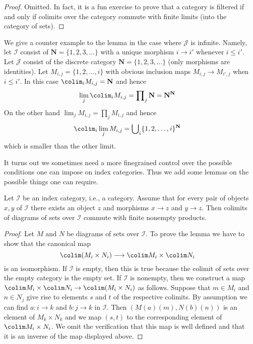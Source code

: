 \begin{proof}
Omitted. In fact, it is a fun exercise to prove that a category is
filtered if and only if colimits over the category commute with finite
limits (into the category of sets).
\end{proof}

\noindent
We give a counter example to the lemma in
the case where $\mathcal{J}$ is infinite. Namely, let
$\mathcal{I}$ consist of $\mathbf{N} = \{1, 2, 3, \ldots\}$
with a unique morphism $i \to i'$ whenever $i \leq i'$.
Let $\mathcal{J}$ consist of the discrete category
$\mathbf{N} = \{1, 2, 3, \ldots\}$ (only morphisms are identities).
Let $M_{i, j} = \{1, 2, \ldots, i\}$ with obvious inclusion maps
$M_{i, j} \to M_{i', j}$ when $i \leq i'$. In this case
$\colim_i M_{i, j} = \mathbf{N}$ and hence
$$
\lim_j \colim_i M_{i, j}
=
\prod\nolimits_j \mathbf{N}
=
\mathbf{N}^\mathbf{N}
$$
On the other hand $\lim_j M_{i, j} = \prod\nolimits_j M_{i, j}$ and
hence
$$
\colim_i \lim_j M_{i, j}
=
\bigcup\nolimits_i \{1, 2, \ldots, i\}^{\mathbf{N}}
$$
which is smaller than the other limit.

\medskip\noindent
It turns out we sometimes need a more finegrained control over the
possible conditions one can impose on index categories. Thus we add
some lemmas on the possible things one can require.

\begin{lemma}
\label{lemma-preserve-products}
Let $\mathcal{I}$ be an index category, i.e., a category. Assume
that for every pair of objects $x, y$ of $\mathcal{I}$
there exists an object $z$ and morphisms $x \to z$ and $y \to z$.
Then colimits of diagrams of sets over $\mathcal{I}$
commute with finite nonempty products.
\end{lemma}

\begin{proof}
Let $M$ and $N$ be diagrams of sets over $\mathcal{I}$.
To prove the lemma we have to show that the canonical map
$$
\colim (M_i \times N_i) \longrightarrow \colim M_i \times \colim N_i
$$
is an isomorphism.
If $\mathcal{I}$ is empty, then this is true because the colimit
of sets over the empty category is the empty set.
If $\mathcal{I}$ is nonempty, then we construct a map
$\colim M_i \times \colim N_i \to \colim (M_i \times N_i)$ as follows.
Suppose that $m \in M_i$ and $n \in N_j$ give rise to elements
$s$ and $t$ of the respective colimits. By assumption we can find
$a : i \to k$ and $b : j \to k$
in $\mathcal{I}$. Then $(M(a)(m), N(b)(n))$ is an element of
$M_k \times N_k$ and we map $(s, t)$ to the corresponding element
of $\colim M_i \times N_i$. We omit the verification that this map
is well defined and that it is an inverse of the map displayed
above.
\end{proof}

